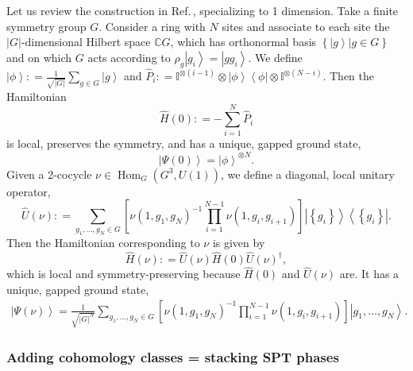 \documentclass[sort&compress]{elsarticle}
\theoremstyle{theoremstyle}
\theoremstyle{framedtheoremstyle}
\theoremstyle{definitionstyle}
\theoremstyle{definitionstyle}
\theoremstyle{definitionstyle}
\theoremstyle{definitionstyle}
\theoremstyle{nameddefinitionstyle}
\theoremstyle{framednameddefinitionstyle}
\theoremstyle{proofstyle}
\theoremstyle{definitionstyle}
\newcommand{\CCC}{\mathbb{C}}
\DeclareMathOperator{\Hom}{Hom}
\newcommand{\coloneq}{\mathrel{\mathop:}=}
\newcommand{\bars}[1]{\left| #1 \right|}
\newcommand{\paren}[1]{\left( #1 \right)}
\newcommand{\brackets}[1]{\left[ #1 \right]}
\newcommand{\braces}[1]{\left\{ #1 \right\}}
\newcommand{\bra}[1]{\left\langle #1\right|}
\newcommand{\ket}[1]{\left|#1\right\rangle}
\newcommand{\ketbra}[2]{\left| #1 \right\rangle\left\langle #2\right|}
\begin{document}
\begin{appendices}
Let us review the construction in Ref.\,\cite{Wen_Boson}, specializing to 1 dimension. Take a finite symmetry group $G$. Consider a ring with $N$ sites and associate to each site the $\bars{G}$-dimensional Hilbert space $\CCC G$, which has orthonormal basis $\braces{\ket{g} | g\in G}$ and on which $G$ acts according to $\rho_{g} \ket{g_i} = \ket{gg_i}$. We define $\ket{\phi} \coloneq \frac{1}{\sqrt{\bars G}} \sum_{g\in G} \ket{g}$ and $\hat P_i \coloneq \mathbb I^{\otimes (i-1)} \otimes \ket{\phi}\bra{\phi} \otimes \mathbb I^{\otimes (N-i)} $. Then the Hamiltonian
\begin{equation}
\hat H(0) \coloneq - \sum_{i =1}^N \hat P_i
\end{equation}
is local, preserves the symmetry, and has a unique, gapped ground state,
\begin{equation}
\ket{\Psi(0)} = \ket{\phi}^{\otimes N}.
\end{equation}
Given a 2-cocycle $\nu \in \Hom_{G}\paren{G^3, U(1)}$, we define a diagonal, local unitary operator,
\begin{equation}
\hat U(\nu) \coloneq \sum_{g_1, \ldots, g_N \in G} 
\brackets{ \nu\paren{1, g_1, g_N}^{-1} \prod_{i=1}^{N-1} \nu\paren{1, g_i, g_{i+1} } } \ketbra{ \braces{g_i} }{ \braces{g_i} }.\label{1_dimensional_case_U(nu)}
\end{equation}
Then the Hamiltonian corresponding to $\nu$ is given by
\begin{equation}
\hat H(\nu) \coloneq \hat U(\nu) \hat H(0) \hat U(\nu)^\dag,
\end{equation}
which is local and symmetry-preserving because $\hat H(0)$ and $\hat U(\nu)$ are. It has a unique, gapped ground state,
\begin{eqnarray}
\ket{ \Psi(\nu) } = \frac{1}{\sqrt{\bars{G}^N}} \sum_{ g_1, \ldots, g_N \in G }
\brackets{ \nu\paren{1, g_1, g_N}^{-1} \prod_{i=1}^{N-1} \nu\paren{1, g_i, g_{i+1} } }
\ket{g_1, \ldots, g_N }.\label{1_dimensional_case_Psi(nu)}
\end{eqnarray}





\subsubsection{Adding cohomology classes = stacking SPT phases\label{subsubapp:adding_cohomology_classes_stacking_SPT_phases}}


\end{appendices}
\end{document}
